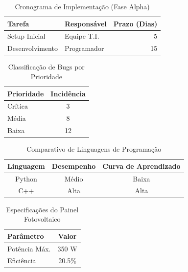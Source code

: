 \documentclass[
	12pt,				%
    oneside,            %
	a4paper,			%
	english,			%
	brazilian,		    %
	]{AcademicoUFT}
\begin{document}
\begin{table}[H]
    \centering
    \caption{Cronograma de Implementação (Fase Alpha)}
    \label{tab:cronograma_alpha}
    \begin{tabular}{llr}
        \toprule
        Tarefa & Responsável & Prazo (Dias) \\
        \midrule
        Setup Inicial & Equipe T.I. & 5 \\
        Desenvolvimento & Programador & 15 \\
        \bottomrule
    \end{tabular}
\end{table}

\begin{table}[H]
    \centering
    \caption{Classificação de Bugs por Prioridade}
    \label{tab:bugs_prioridade}
    \begin{tabular}{lc}
        \toprule
        Prioridade & Incidência \\
        \midrule
        Crítica & 3 \\
        Média & 8 \\
        Baixa & 12 \\
        \bottomrule
    \end{tabular}
\end{table}

\begin{table}[H]
    \centering
    \caption{Comparativo de Linguagens de Programação}
    \label{tab:linguagens_comp}
    \begin{tabular}{ccc}
        \toprule
        Linguagem & Desempenho & Curva de Aprendizado \\
        \midrule
        Python & Médio & Baixa \\
        C++ & Alta & Alta \\
        \bottomrule
    \end{tabular}
\end{table}

\begin{table}[H]
    \centering
    \caption{Especificações do Painel Fotovoltaico}
    \label{tab:painel_foto}
    \begin{tabular}{lc}
        \toprule
        Parâmetro & Valor \\
        \midrule
        Potência Máx. & 350 W \\
        Eficiência & 20.5\% \\
        \bottomrule
    \end{tabular}
\end{table}
\end{document}
